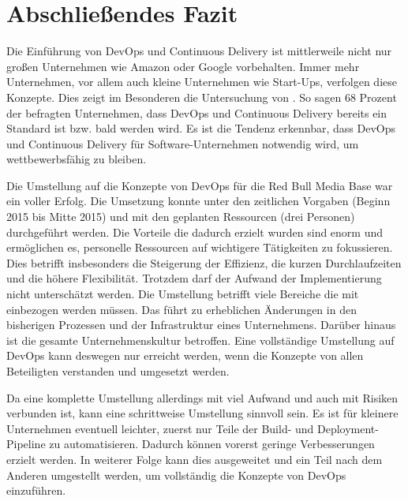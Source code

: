 \section{Abschließendes Fazit}
Die Einführung von DevOps und Continuous Delivery ist mittlerweile nicht nur großen Unternehmen wie Amazon oder Google vorbehalten. Immer mehr Unternehmen, vor allem auch kleine Unternehmen wie Start-Ups, verfolgen diese Konzepte. Dies zeigt im Besonderen die Untersuchung von \cite{dzone2015}. So sagen 68 Prozent der befragten Unternehmen, dass DevOps und Continuous Delivery bereits ein Standard ist bzw. bald werden wird. Es ist die Tendenz erkennbar, dass DevOps und Continuous Delivery für Software-Unternehmen notwendig wird, um wettbewerbsfähig zu bleiben.

Die Umstellung auf die Konzepte von DevOps für die Red Bull Media Base war ein voller Erfolg. Die Umsetzung konnte unter den zeitlichen Vorgaben (Beginn 2015 bis Mitte 2015) und mit den geplanten Ressourcen (drei Personen) durchgeführt werden. Die Vorteile die dadurch erzielt wurden sind enorm und ermöglichen es, personelle Ressourcen auf wichtigere Tätigkeiten zu fokussieren. Dies betrifft insbesonders die Steigerung der Effizienz, die kurzen Durchlaufzeiten und die höhere Flexibilität. Trotzdem darf der Aufwand der Implementierung nicht unterschätzt werden. Die Umstellung betrifft viele Bereiche die mit einbezogen werden müssen. Das führt zu erheblichen Änderungen in den bisherigen Prozessen und der Infrastruktur eines Unternehmens. Darüber hinaus ist die gesamte Unternehmenskultur betroffen. Eine vollständige Umstellung auf DevOps kann deswegen nur erreicht werden, wenn die Konzepte von allen Beteiligten verstanden und umgesetzt werden. 

Da eine komplette Umstellung allerdings mit viel Aufwand und auch mit Risiken verbunden ist, kann eine schrittweise Umstellung sinnvoll sein. Es ist für kleinere Unternehmen eventuell leichter, zuerst nur Teile der Build- und Deployment-Pipeline zu automatisieren. Dadurch können vorerst geringe Verbesserungen erzielt werden. In weiterer Folge kann dies ausgeweitet und ein Teil nach dem Anderen umgestellt werden, um vollständig die Konzepte von DevOps einzuführen.
